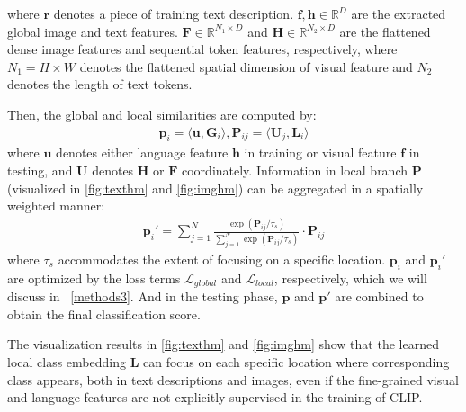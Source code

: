 \documentclass[10pt,twocolumn,letterpaper]{article}
\begin{document}
\noindent where $\boldsymbol r$ denotes a piece of training text description.
$\boldsymbol f, \boldsymbol h \in \mathbb{R}^D$ are the extracted global image and text features.
$\boldsymbol F \in \mathbb{R}^{N_1\times D}$ and $\boldsymbol H \in \mathbb{R}^{N_2\times D}$ are the flattened dense image features and sequential token features, respectively, where $ N_1 = H \times W $ denotes the flattened spatial dimension of visual feature and $ N_2$ denotes the length of text tokens.

Then, the global and local similarities are computed by:
\begin{equation}
\begin{split}
  \boldsymbol p_i = \langle \boldsymbol u, \boldsymbol G_i \rangle ,
  \boldsymbol P_{ij} = \langle \boldsymbol U_j, \boldsymbol L_i \rangle
  \label{eq:cos}
\end{split}
\end{equation}
\noindent where $\boldsymbol u$ denotes either language feature $\boldsymbol h$ in training or visual feature $\boldsymbol f$ in testing, and $\boldsymbol U$ denotes $\boldsymbol H$ or $\boldsymbol F$ coordinately.
Information in local branch $\boldsymbol P$ (visualized in \cref{fig:texthm} and \cref{fig:imghm}) can be aggregated in a spatially weighted manner:
\begin{equation}
\begin{split}
  \boldsymbol p_{i}' =\textstyle \sum_{j=1}^{N} \displaystyle \frac{\exp(\boldsymbol P_{ij} / \tau_s)}{ {\textstyle \sum_{j=1}^{N}}\exp(\boldsymbol P_{ij} / \tau_s) } \cdot \boldsymbol P_{ij}
  \label{eq:spatial}
\end{split}
\end{equation}
\noindent where $\tau_s$ accommodates the extent of focusing on a specific location.
$\boldsymbol p_i$ and $\boldsymbol p_i'$ are optimized by the loss terms $\mathcal{L}_{global}$ and $\mathcal{L}_{local}$, respectively, which we will discuss in ~\cref{methods3}. And in the testing phase, $\boldsymbol p$ and $\boldsymbol p'$ are combined to obtain the final classification score.

The visualization results in \cref{fig:texthm} and \cref{fig:imghm} show that the learned local class embedding $\boldsymbol L$ can focus on each specific location where corresponding class appears, both in text descriptions and images, even if the fine-grained visual and language features are not explicitly supervised in the training of CLIP. 
\end{document}
